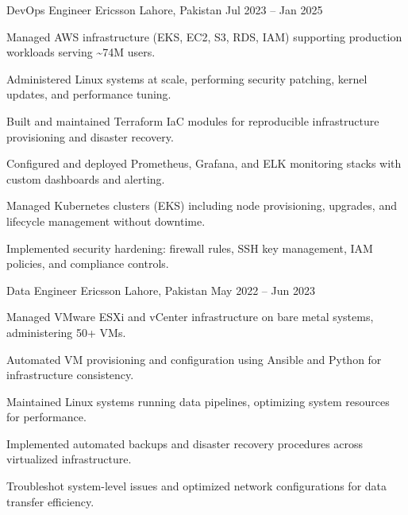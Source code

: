 \documentclass[11pt, a4paper]{awesome-cv}
\begin{document}
\makecvheader[C]


\begin{cventries}

\cventry
{DevOps Engineer}
{Ericsson}
{Lahore, Pakistan}
{Jul 2023 -- Jan 2025}
{
\begin{cvitems}
\item {Managed AWS infrastructure (EKS, EC2, S3, RDS, IAM) supporting production workloads serving \textasciitilde74M users.}
\item {Administered Linux systems at scale, performing security patching, kernel updates, and performance tuning.}
\item {Built and maintained Terraform IaC modules for reproducible infrastructure provisioning and disaster recovery.}
\item {Configured and deployed Prometheus, Grafana, and ELK monitoring stacks with custom dashboards and alerting.}
\item {Managed Kubernetes clusters (EKS) including node provisioning, upgrades, and lifecycle management without downtime.}
\item {Implemented security hardening: firewall rules, SSH key management, IAM policies, and compliance controls.}
\end{cvitems}
}

\cventry
{Data Engineer}
{Ericsson}
{Lahore, Pakistan}
{May 2022 -- Jun 2023}
{
\begin{cvitems}
\item {Managed VMware ESXi and vCenter infrastructure on bare metal systems, administering 50+ VMs.}
\item {Automated VM provisioning and configuration using Ansible and Python for infrastructure consistency.}
\item {Maintained Linux systems running data pipelines, optimizing system resources for performance.}
\item {Implemented automated backups and disaster recovery procedures across virtualized infrastructure.}
\item {Troubleshot system-level issues and optimized network configurations for data transfer efficiency.}
\end{cvitems}
}


\end{cventries}
\end{document}
